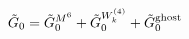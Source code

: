 \begin{equation}
 {\tilde G}_0
 = {\tilde G}_0^{M^6} + {\tilde G}_0^{W^{(4)}_k} 
 + {\tilde G}_0^{\rm ghost}
\end{equation}

